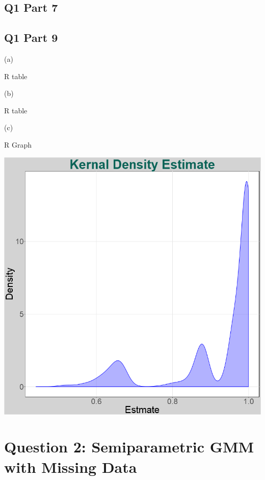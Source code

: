 \documentclass[11pt]{article}
\begin{document}
\subsection{Q1 Part 7}



\subsection{Q1 Part 9 }
(a)\\

\centerline{R table }

\begin{center}
	
\end{center}



(b)

\centerline{R table }

\begin{center}
	
\end{center}


(c)
\centerline{R Graph }
\begin{center}
	\includegraphics[width=.8\linewidth]{plot_q1_9_c.png}
	
\end{center}



\section{Question 2: Semiparametric GMM with Missing Data}
\end{document}
